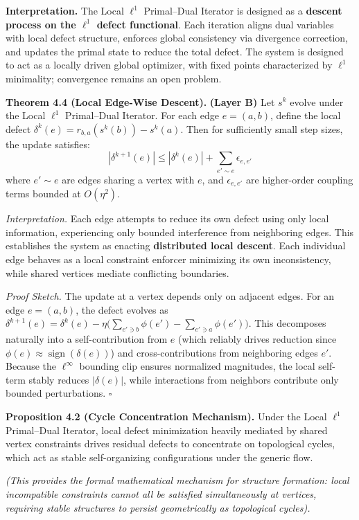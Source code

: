 \documentclass[
]{article}
\begin{document}
\textbf{Interpretation.} The Local \(\ell^1\) Primal--Dual Iterator is
designed as a \textbf{descent process on the \(\ell^1\) defect
functional}. Each iteration aligns dual variables with local defect
structure, enforces global consistency via divergence correction, and
updates the primal state to reduce the total defect. The system is
designed to act as a locally driven global optimizer, with fixed points
characterized by \(\ell^1\) minimality; convergence remains an open
problem.

\textbf{Theorem 4.4 (Local Edge-Wise Descent).} \textbf{(Layer B)} Let
\(s^k\) evolve under the Local \(\ell^1\) Primal--Dual Iterator. For
each edge \(e = (a,b)\), define the local defect
\(\delta^k(e) = r_{b,a}(s^k(b)) - s^k(a)\). Then for sufficiently small
step sizes, the update satisfies:
\[ |\delta^{k+1}(e)| \le |\delta^k(e)| + \sum_{e' \sim e} \epsilon_{e,e'} \]
where \(e' \sim e\) are edges sharing a vertex with \(e\), and
\(\epsilon_{e,e'}\) are higher-order coupling terms bounded at
\(O(\eta^2)\).

\emph{Interpretation.} Each edge attempts to reduce its own defect using
only local information, experiencing only bounded interference from
neighboring edges. This establishes the system as enacting
\textbf{distributed local descent}. Each individual edge behaves as a
local constraint enforcer minimizing its own inconsistency, while shared
vertices mediate conflicting boundaries.

\emph{Proof Sketch.} The update at a vertex depends only on adjacent
edges. For an edge \(e=(a,b)\), the defect evolves as
\(\delta^{k+1}(e) = \delta^k(e) - \eta \big(\sum_{e' \ni b} \phi(e') - \sum_{e' \ni a} \phi(e')\big)\).
This decomposes naturally into a self-contribution from \(e\) (which
reliably drives reduction since
\(\phi(e) \approx \operatorname{sign}(\delta(e))\)) and
cross-contributions from neighboring edges \(e'\). Because the
\(\ell^\infty\) bounding clip ensures normalized magnitudes, the local
self-term stably reduces \(|\delta(e)|\), while interactions from
neighbors contribute only bounded perturbations. \(\square\)

\textbf{Proposition 4.2 (Cycle Concentration Mechanism).} Under the
Local \(\ell^1\) Primal--Dual Iterator, local defect minimization
heavily mediated by shared vertex constraints drives residual defects to
concentrate on topological cycles, which act as stable self-organizing
configurations under the generic flow.

\emph{(This provides the formal mathematical mechanism for structure
formation: local incompatible constraints cannot all be satisfied
simultaneously at vertices, requiring stable structures to persist
geometrically as topological cycles).}
\end{document}
